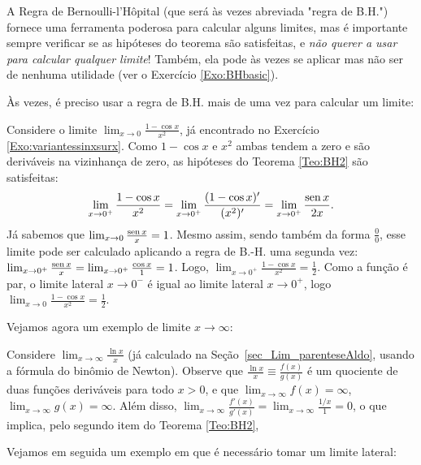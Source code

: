 \begin{obs}
A Regra de Bernoulli-l'Hôpital (que será às vezes abreviada "regra de B.H.") 
fornece uma ferramenta poderosa para calcular alguns limites, mas é
importante sempre verificar se as hipóteses do teorema são 
satisfeitas, e \emph{não querer a usar para calcular qualquer limite}!
Também, ela pode às vezes se aplicar mas não ser de nenhuma utilidade (ver o
Exercício \ref{Exo:BHbasic}).
\end{obs}



Às vezes, é preciso usar a regra de B.H. mais de uma vez para calcular um
limite:
\begin{ex}
Considere o limite $\lim_{x\to 0}\frac{1-\cos x}{x^2}$, já
encontrado no Exercício \ref{Exo:variantessinxsurx}.
Como $1-\cos x$ e $x^2$ ambas tendem a zero e são deriváveis na vizinhança de
zero, as hipóteses do Teorema \eqref{Teo:BH2} são satisfeitas:
$$\lim_{x\to 0^+}\frac{1-\cos x}{x^2}
=\lim_{x\to 0^+}\frac{(1-\cos x)'}{(x^2)'}=
\lim_{x\to 0^+}\frac{\operatorname{sen} x}{2x}.
$$
Já sabemos 
que $\lim_{x\to 0}\frac{\operatorname{sen} x}{x}=1$. Mesmo assim, 
sendo também da forma $\frac00$, esse limite pode ser calculado aplicando a
regra de B.-H. uma segunda vez: $\lim_{x\to 0^+}\frac{\operatorname{sen} x}{x}=\lim_{x\to
0^+}\frac{\cos
x}{1}=1$. Logo, $\lim_{x\to 0^+}\frac{1-\cos x}{x^2}=\frac12$.
Como a função é par, o limite lateral $x\to 0^-$ é igual ao limite
lateral $x\to 0^+$, logo $\lim_{x\to 0}\frac{1-\cos x}{x^2}=\frac12$.
\end{ex}

Vejamos agora um exemplo de limite $x\to \infty$:
\begin{ex}\label{Ex:logsurx}
Considere $\lim_{x\to \infty}\frac{\ln x}{x}$ (já calculado na
Seção~\ref{sec_Lim_parenteseAldo}, usando a fórmula do binômio
de Newton). 
Observe que $\frac{\ln x}{x}\equiv \frac{f(x)}{g(x)}$ 
é um quociente de duas funções deriváveis para todo $x>0$, 
e que $\lim_{x\to \infty}f(x)=\infty$, $\lim_{x\to \infty}g(x)=\infty$.
Além disso, $\lim_{x\to \infty}\frac{f'(x)}{g'(x)}=\lim_{x\to
\infty}\frac{1/x}{1}=0$, o que implica, pelo segundo item do 
Teorema \ref{Teo:BH2},
\end{ex}

Vejamos em seguida um exemplo em que é necessário tomar um limite lateral:

